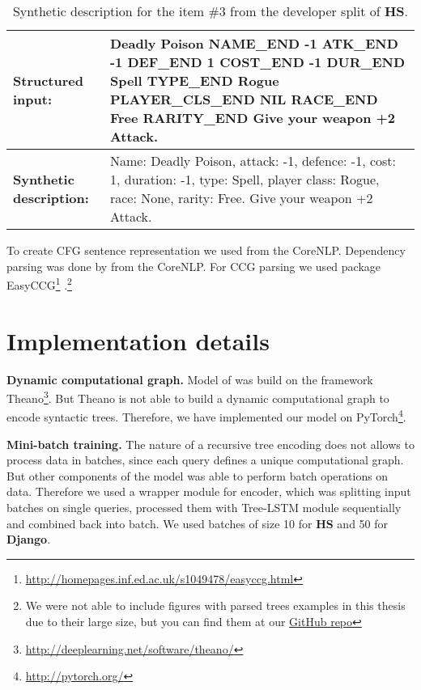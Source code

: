 \begin{table}
\begin{tabularx}{\textwidth}{ l X }
\hline
\textbf{Structured input:} & Deadly Poison NAME\_END -1 ATK\_END -1 DEF\_END 1 COST\_END -1 DUR\_END Spell TYPE\_END Rogue PLAYER\_CLS\_END NIL RACE\_END Free RARITY\_END Give your weapon +2 Attack. \\
\hline 
\textbf{Synthetic description:} & Name: Deadly Poison, attack: -1, defence: -1, cost: 1, duration: -1, type: Spell, player class: Rogue, race: None, rarity: Free. Give your weapon +2 Attack. \\
\hline
\end{tabularx}
\caption[Synthetic description example]{Synthetic description for the item \#3 from the developer split of \textbf{HS}.}
\label{table:hs_input}
\end{table}

To create CFG sentence representation we used  \parencite{klein2003} from the CoreNLP. Dependency parsing was done by  \parencite{chen2014} from the CoreNLP. For CCG parsing we used package EasyCCG\footnote{\href{http://homepages.inf.ed.ac.uk/s1049478/easyccg.html}{http://homepages.inf.ed.ac.uk/s1049478/easyccg.html}} \parencite{lewis2014}.\footnote{We were not able to include figures with parsed trees examples in this thesis due to their large size, but you can find them at our \href{https://github.com/tsdaemon/treelstm-code-generation/tree/master/pictures}{GitHub repo}}

\section{Implementation details}

\textbf{Dynamic computational graph.} Model of \cite{Yin2017} was build on the framework Theano\footnote{\href{http://deeplearning.net/software/theano/}{http://deeplearning.net/software/theano/}}. But Theano is not able to build a dynamic computational graph to encode syntactic trees. Therefore, we have implemented our model on PyTorch\footnote{\href{http://pytorch.org/}{http://pytorch.org/}}.


\textbf{Mini-batch training.} The nature of a recursive tree encoding does not allows to process data in batches, since each query defines a unique computational graph. But other components of the model was able to perform batch operations on data. Therefore we used a wrapper module for encoder, which was splitting input batches on single queries, processed them with Tree-LSTM module sequentially and combined back into batch. We used batches of size 10 for \textbf{HS} and 50 for \textbf{Django}.

